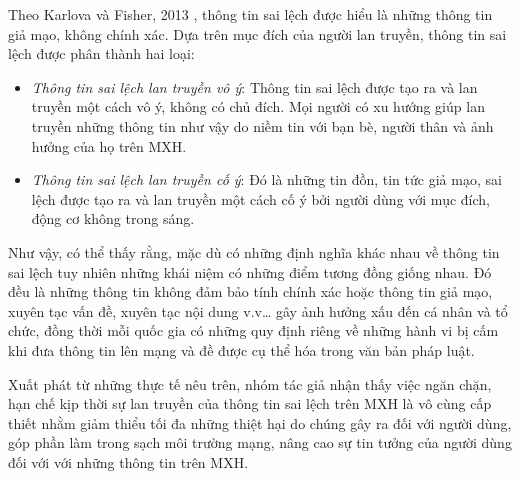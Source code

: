 		Theo Karlova và Fisher, 2013 \cite{karlova1}, thông tin sai lệch được hiểu là những thông tin giả mạo, không chính xác. Dựa trên mục đích của người lan truyền, thông tin sai lệch được phân thành hai loại:
		\begin {itemize}
			\item {\itshape Thông tin sai lệch lan truyền vô ý}: Thông tin sai lệch được tạo ra và lan truyền một cách vô ý, không có chủ đích. Mọi người có xu hướng giúp lan truyền những thông tin như vậy do niềm tin với bạn bè, người thân và ảnh hưởng của họ trên MXH.
		
			\item {\itshape Thông tin sai lệch lan truyền cố ý}: Đó là những tin đồn, tin tức giả mạo, sai lệch được tạo ra và lan truyền một cách cố ý bởi người dùng với mục đích, động cơ không trong sáng.
		\end {itemize}
		Như vậy, có thể thấy rằng, mặc dù có những định nghĩa khác nhau về thông tin sai lệch tuy nhiên những khái niệm có những điểm tương đồng giống nhau. Đó đều là những thông tin không đảm bảo tính chính xác hoặc thông tin giả mạo, xuyên tạc vấn đề, xuyên tạc nội dung v.v… gây ảnh hưởng xấu đến cá nhân và tổ chức, đồng thời mỗi quốc gia có những quy định riêng về những hành vi bị cấm khi đưa thông tin lên mạng và đề được cụ thể hóa trong văn bản pháp luật.
		
		Xuất phát từ những thực tế nêu trên, nhóm tác giả nhận thấy việc ngăn chặn, hạn chế kịp thời sự lan truyền của thông tin sai lệch trên MXH là vô cùng cấp thiết nhằm giảm thiểu tối đa những thiệt hại do chúng gây ra đối với người dùng, góp phần làm trong sạch môi trường mạng, nâng cao sự tin tưởng của người dùng đối với với những thông tin trên MXH. 
